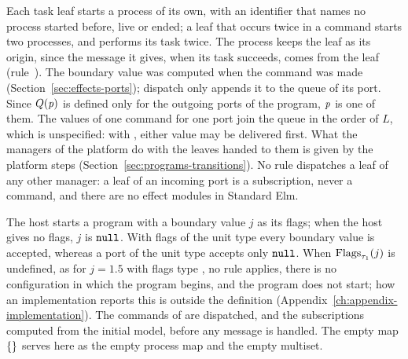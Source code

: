 \begin{rulecomments}
 Each task leaf starts a process of its own, with an
identifier that names no process started before, live or ended; a leaf that
occurs twice in a command starts two processes, and performs its task twice.
The process keeps the leaf as its origin, since the message it gives, when
its task succeeds, comes from the leaf (rule~).
 The boundary value was computed when the command was made
(Section~\ref{sec:effects-ports}); dispatch only appends it to the queue of
its port. Since $Q(\mathit{p})$ is defined only for the outgoing ports of the
program, $\mathit{p}$ is one of them. The values of one command for one port
join the queue in the order of $L$, which is unspecified: with
, either value may be delivered first. %
 What the managers of the platform do with the leaves
handed to them is given by the platform steps
(Section~\ref{sec:programs-transitions}). No rule dispatches a leaf of any
other manager: a leaf of an incoming port is a subscription, never a
command, and there are no effect modules in Standard Elm. %
\end{rulecomments}


  {}

\begin{rulecomments}
 The host starts a program with a boundary value $j$ as
its flags; when the host gives no flags, $j$ is $\mathtt{null}$. %
With flags of the unit type every boundary value is accepted, whereas a port of
the unit type accepts only $\mathtt{null}$. %
When $\mathrm{Flags}_{\tau_1}(j)$ is undefined, as for $j=1.5$ with flags type
, no rule applies, there is no configuration in which the program
begins, and the program does not start; how an implementation reports this
is outside the definition (Appendix~\ref{ch:appendix-implementation}). %
The commands of  are dispatched, and the subscriptions computed from
the initial model, before any message is handled. The empty map
$\{\}$ serves here as the empty process map and the empty multiset.
\end{rulecomments}

